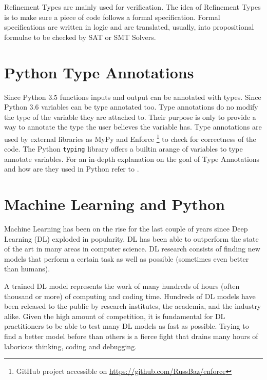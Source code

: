 Refinement Types \autocite{rushby_subtypes_1998} are mainly used for
verification. The idea of Refinement Types is to make sure a piece of
code follows a formal specification. Formal specifications are written
in logic and are translated, usually, into propositional formulae to be
checked by SAT or SMT Solvers.

\section{Python Type Annotations}\label{python-type-annotations}

Since Python 3.5 \autocite{pep484} functions inputs and output can be
annotated with types. Since Python 3.6 \autocite{pep526} variables can
be type annotated too. Type annotations do no modify the type of the
variable they are attached to. Their purpose is only to provide a way to
annotate the type the user believes the variable has. Type annotations
are used by external libraries as MyPy \autocite{lehtosalo2016mypy} and
Enforce \footnote{GitHub project accessible on
  \url{https://github.com/RussBaz/enforce}} to check for correctness of
the code. The Python \texttt{typing} library offers a builtin arange of
variables to type annotate variables. For an in-depth explanation on the
goal of Type Annotations and how are they used in Python refer to
\autocite{pep483}.

\section{Machine Learning and Python}%
\label{machine-learning-and-python}

Machine Learning has been on the rise for the last couple of years since
Deep Learning (DL) exploded in popularity. DL has been able to
outperform the state of the art in many areas in computer science. DL
research consists of finding new models that perform a certain task as
well as possible (sometimes even better than humans).

A trained DL model represents the work of many hundreds of hours (often
thousand or more) of computing and coding time. Hundreds of DL models
have been released to the public by research institutes, the academia,
and the industry alike. Given the high amount of competition, it is
fundamental for DL practitioners to be able to test many DL models as
fast as possible. Trying to find a better model before than others is a
fierce fight that drains many hours of laborious thinking, coding and
debugging.

